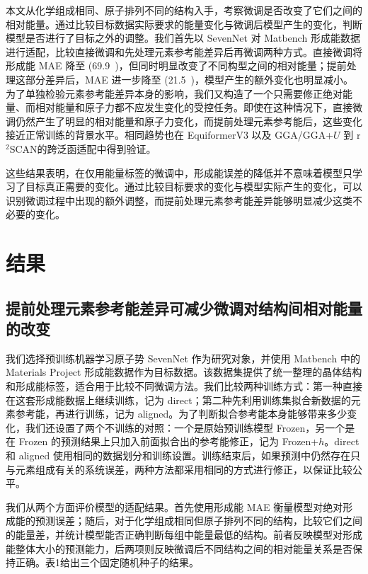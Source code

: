 \documentclass[UTF8,a4paper,12pt,fontset=fandol]{ctexart}
\begin{document}
本文从化学组成相同、原子排列不同的结构入手，考察微调是否改变了它们之间的相对能量。通过比较目标数据实际要求的能量变化与微调后模型产生的变化，判断模型是否进行了目标之外的调整。我们首先以 SevenNet 对 Matbench 形成能数据进行适配，比较直接微调和先处理元素参考能差异后再微调两种方式。直接微调将形成能 MAE 降至 (69.9~)，但同时明显改变了不同构型之间的相对能量；提前处理这部分差异后，MAE 进一步降至 (21.5~)，模型产生的额外变化也明显减小。
为了单独检验元素参考能差异本身的影响，我们又构造了一个只需要修正绝对能量、而相对能量和原子力都不应发生变化的受控任务。即使在这种情况下，直接微调仍然产生了明显的相对能量和原子力变化，而提前处理元素参考能后，这些变化接近正常训练的背景水平。相同趋势也在 EquiformerV3 以及 GGA/GGA+\(U\) 到 r$^2$SCAN的跨泛函适配中得到验证。

这些结果表明，在仅用能量标签的微调中，形成能误差的降低并不意味着模型只学习了目标真正需要的变化。通过比较目标要求的变化与模型实际产生的变化，可以识别微调过程中出现的额外调整，而提前处理元素参考能差异能够明显减少这类不必要的变化。

\section{结果}

\subsection{提前处理元素参考能差异可减少微调对结构间相对能量的改变}

我们选择预训练机器学习原子势 SevenNet 作为研究对象，并使用 Matbench 中的 Materials Project 形成能数据作为目标数据。该数据集提供了统一整理的晶体结构和形成能标签，适合用于比较不同微调方法。我们比较两种训练方式：第一种直接在这套形成能数据上继续训练，记为 direct；第二种先利用训练集拟合新数据的元素参考能，再进行训练，记为 aligned。为了判断拟合参考能本身能够带来多少变化，我们还设置了两个不训练的对照：一个是原始预训练模型 Frozen，另一个是在 Frozen 的预测结果上只加入前面拟合出的参考能修正，记为 Frozen+$h$。direct 和 aligned 使用相同的数据划分和训练设置。训练结束后，如果预测中仍然存在只与元素组成有关的系统误差，两种方法都采用相同的方式进行修正，以保证比较公平。

我们从两个方面评价模型的适配结果。首先使用形成能 MAE 衡量模型对绝对形成能的预测误差；随后，对于化学组成相同但原子排列不同的结构，比较它们之间的能量差，并统计模型能否正确判断每组中能量最低的结构。前者反映模型对形成能整体大小的预测能力，后两项则反映微调后不同结构之间的相对能量关系是否保持正确。表1给出三个固定随机种子的结果。
\end{document}
